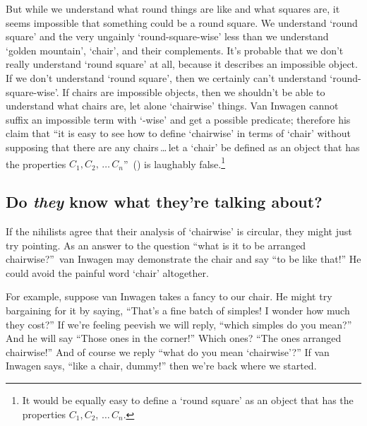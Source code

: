 \documentclass[11pt]{article}
\begin{document}
\begin{spacing}{1.5}
But while we understand what round things are like and what squares are, it seems impossible that something could be a round square. We understand `round square' and the very ungainly `round-square-wise' less than we understand `golden mountain', `chair', and their complements. It's probable that we don't really understand `round square' at all, because it describes an impossible object. If we don't understand `round square', then we certainly can't understand `round-square-wise'. If chairs are impossible objects, then we shouldn't be able to understand what chairs are, let alone `chairwise' things. Van Inwagen cannot suffix an impossible term with `-wise' and get a possible predicate; therefore his claim that ``it is easy to see how to define `chairwise' in terms of `chair' without supposing that there are any chairs\,\ldots\,let a `chair' be defined as an object that has the properties $C_{1}, C_{2},\,\dots\,C_{n}$''~(\citeyear[719]{inwagen1993b}) is laughably false.\footnote{It would be equally easy to define a `round square' as an object that has the properties $C_{1}, C_{2},\,\dots\,C_{n}$.}
%

\subsection{Do {\em they} know what they're talking about?}
If the nihilists agree that their analysis of `chairwise' is circular, they might just try pointing. As an answer to the question ``what is it to be arranged chairwise?''\ van Inwagen may demonstrate the chair and say ``to be like that!'' He could avoid the painful word `chair' altogether.

For example, suppose van Inwagen takes a fancy to our chair. He might try bargaining for it by saying, ``That's a fine batch of simples! I wonder how much they cost?'' If we're feeling peevish we will reply, ``which simples do you mean?'' And he will say ``Those ones in the corner!'' Which ones? ``The ones arranged chairwise!'' And of course we reply ``what do you mean `chairwise'?'' If van Inwagen says, ``like a chair, dummy!'' then we're back where we started.


\end{spacing}
\end{document}

